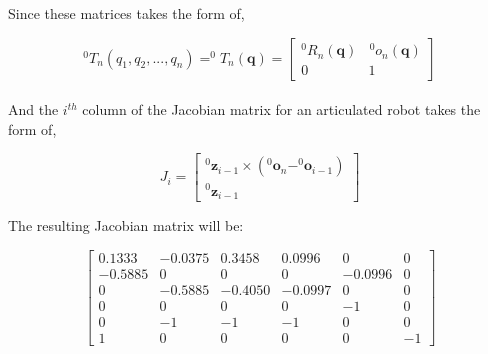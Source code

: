 Since these matrices takes the form of,

\begin{equation*}
    ^0T_n(q_1, q_2, ..., q_n) = ^0T_n(\textbf{q}) = \begin{bmatrix}
        ^0R_n(\textbf{q}) & \hspace{1pt}^0o_n(\textbf{q}) \\
        0                 & 1
    \end{bmatrix}
\end{equation*}
\\ And the $i^{th}$ column of the Jacobian matrix for an articulated robot takes the form of,

\begin{equation*}
    J_i = \begin{bmatrix}
        ^0\textbf{z}_{i-1} \times (^0\textbf{o}_{n} - ^0\textbf{o}_{i-1}) \\
        ^0\textbf{z}_{i-1}
    \end{bmatrix}
\end{equation*}

The resulting Jacobian matrix will be:

\begin{equation*}
    \begin{bmatrix}
        0.1333  & -0.0375 & 0.3458  & 0.0996  & 0       & 0  \\
        -0.5885 & 0       & 0       & 0       & -0.0996 & 0  \\
        0       & -0.5885 & -0.4050 & -0.0997 & 0       & 0  \\
        0       & 0       & 0       & 0       & -1      & 0  \\
        0       & -1      & -1      & -1      & 0       & 0  \\
        1       & 0       & 0       & 0       & 0       & -1
    \end{bmatrix}
\end{equation*}